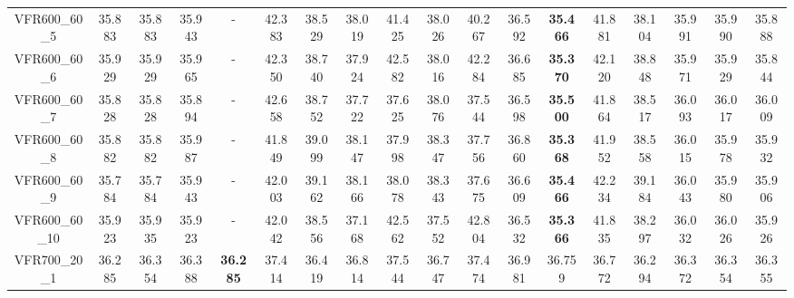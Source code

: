\begin{tabular}{cc|ccc|ccccccccccccc}
VFR600\_60\_5      & 35.883           & 35.883           & 35.943           & -                & 42.383           & 38.529           & 38.019           & 41.425           & 38.026           & 40.267           & 36.592           & {\bf 35.466}     & 41.881           & 38.104           & 35.991           & 35.990           & 35.888          \\ 
VFR600\_60\_6      & 35.929           & 35.929           & 35.965           & -                & 42.350           & 38.740           & 37.924           & 42.582           & 38.016           & 42.284           & 36.685           & {\bf 35.370}     & 42.120           & 38.848           & 35.971           & 35.929           & 35.844          \\ 
VFR600\_60\_7      & 35.828           & 35.828           & 35.894           & -                & 42.658           & 38.752           & 37.722           & 37.625           & 38.076           & 37.544           & 36.598           & {\bf 35.500}     & 41.864           & 38.517           & 36.093           & 36.017           & 36.009          \\ 
VFR600\_60\_8      & 35.882           & 35.882           & 35.987           & -                & 41.849           & 39.099           & 38.147           & 37.998           & 38.347           & 37.756           & 36.860           & {\bf 35.368}     & 41.952           & 38.558           & 36.015           & 35.978           & 35.932          \\ 
VFR600\_60\_9      & 35.784           & 35.784           & 35.943           & -                & 42.003           & 39.162           & 38.166           & 38.078           & 38.343           & 37.675           & 36.609           & {\bf 35.466}     & 42.234           & 39.184           & 36.043           & 35.980           & 35.906          \\ 
VFR600\_60\_10     & 35.923           & 35.935           & 35.923           & -                & 42.042           & 38.556           & 37.168           & 42.562           & 37.552           & 42.804           & 36.532           & {\bf 35.366}     & 41.835           & 38.297           & 36.032           & 36.026           & 35.926          \\ 
VFR700\_20\_1      & 36.285           & 36.354           & 36.388           & {\bf 36.285}     & 37.414           & 36.419           & 36.814           & 37.544           & 36.747           & 37.474           & 36.981           & 36.759           & 36.772           & 36.294           & 36.372           & 36.354           & 36.355          \\ 

\end{tabular}
